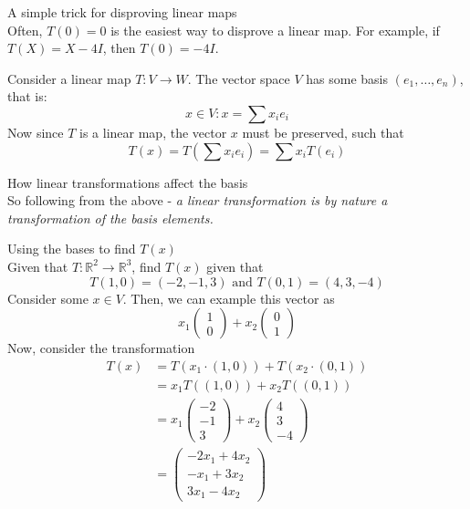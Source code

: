 \documentclass[journal, letterpaper]{IEEEtran}
\begin{document}
    \begin{myboxr}{A simple trick for disproving linear maps} \\ 
        Often, $T(0) = 0$ is the easiest way to disprove a linear map. For example, if $T(X) = X - 4I$, then $T(0) = -4I$.
    \end{myboxr}
    Consider a linear map $T : V \to W$. The vector space $V$ has some basis $(e_1, \dots, e_n)$, that is:
    $$ x \in V : x = \sum x_i e_i$$
    Now since $T$ is a linear map, the vector $x$ must be preserved, such that
    $$ T(x) = T\left(\sum x_ie_i\right) = \sum x_i T(e_i)$$
    \begin{mybox}{How linear transformations affect the basis} \\ 
        So following from the above - \textit{a linear transformation is by nature a transformation of the basis elements.}
    \end{mybox}
    \begin{myboxg}{Using the bases to find $T(x)$} \\ 
        Given that $T : \mathbb{R}^2 \to \mathbb{R}^3$, find $T(x)$ given that
        $$ T(1, 0) = (-2, -1, 3) \text{ and } T(0, 1) = (4, 3, -4)$$
        \newline
        Consider some $x \in V$. Then, we can example this vector as
        $$ x_1 \begin{pmatrix}
            1 \\ 0
        \end{pmatrix} + x_2 \begin{pmatrix}
            0 \\ 1
        \end{pmatrix}$$
        Now, consider the transformation
        \begin{align*}
        T(x) &= T(x_1 \cdot (1, 0)) + T(x_2 \cdot (0, 1)) \\
             &= x_1 T((1, 0)) + x_2 T((0, 1)) \\
             &= x_1\begin{pmatrix}
                -2 \\ -1 \\ 3
             \end{pmatrix} + x_2 \begin{pmatrix}
                4 \\ 3 \\ -4
             \end{pmatrix} \\ &= \begin{pmatrix}
                -2x_1 + 4x_2 \\ -x_1 + 3x_2 \\ 3x_1 - 4x_2
             \end{pmatrix}
        \end{align*}
    \end{myboxg}
\end{document}
